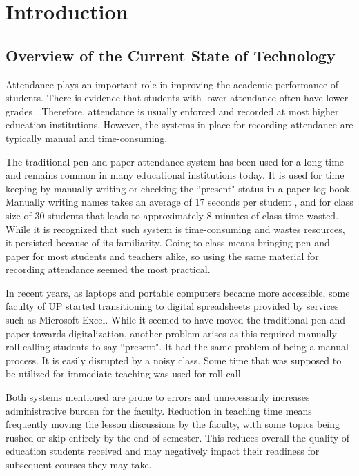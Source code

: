 \chapter{Introduction}
\label{sec:researchdesc}    %

\section{Overview of the Current State of Technology}
\label{sec:overview}

Attendance plays an important role in improving the academic performance of students. There is evidence that students with lower attendance often have lower grades \cite{EJES3887}. Therefore, attendance is usually enforced and recorded at most higher education institutions. However, the systems in place for recording attendance are typically manual and time-consuming.

The traditional pen and paper attendance system has been used for a long time and remains common in many educational institutions today. It is used for time keeping by manually writing or checking the ``present" status in a paper log book. Manually writing names takes an average of 17 seconds per student \cite{shoewu:2014}, and for class size of 30 students that leads to approximately 8 minutes of class time wasted. While it is recognized that such system is time-consuming and wastes resources, it persisted because of its familiarity. Going to class means bringing pen and paper for most students and teachers alike, so using the same material for recording attendance seemed the most practical.

In recent years, as laptops and portable computers became more accessible, some faculty of UP started transitioning to digital spreadsheets provided by services such as Microsoft Excel. While it seemed to have moved the traditional pen and paper towards digitalization, another problem arises as this required manually roll calling students to say ``present". It had the same problem of being a manual process. It is easily disrupted by a noisy class. Some time that was supposed to be utilized for immediate teaching was used for roll call.

Both systems mentioned are prone to errors and unnecessarily increases administrative burden for the faculty. Reduction in teaching time means frequently moving the lesson discussions by the faculty, with some topics being rushed or skip entirely by the end of semester. This reduces overall the quality of education students received and may negatively impact their readiness for subsequent courses they may take. 

